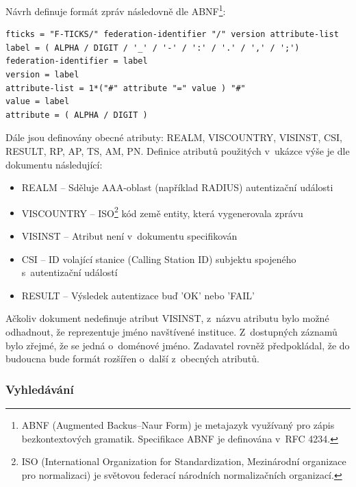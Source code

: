 \documentclass[thesis=M,czech]{FITthesis}[2012/06/26]
\begin{document}
    Návrh definuje formát zpráv následovně dle ABNF\footnote{
      ABNF (Augmented Backus--Naur Form) je metajazyk využívaný pro zápis bezkontextových gramatik.
      Specifikace ABNF je definována v~RFC 4234.
    }:
    \begin{verbatim}
fticks = "F-TICKS/" federation-identifier "/" version attribute-list
label = ( ALPHA / DIGIT / '_' / '-' / ':' / '.' / ',' / ';')
federation-identifier = label
version = label
attribute-list = 1*("#" attribute "=" value ) "#"
value = label
attribute = ( ALPHA / DIGIT )
    \end{verbatim}

    Dále jsou definovány obecné atributy: REALM, VISCOUNTRY, VISINST, CSI, RESULT, RP, AP, TS, AM, PN.
    Definice atributů použitých v~ukázce výše je dle dokumentu následující:
    \begin{itemize}
      \item{REALM -- Sděluje AAA-oblast (například RADIUS) autentizační události}
      \item{VISCOUNTRY -- ISO\footnote{
        ISO (International Organization for Standardization, Mezinárodní organizace pro normalizaci) je světovou
        federací národních normalizačních organizací.
      }
      kód země entity, která vygenerovala zprávu}
      \item{VISINST -- Atribut není v~dokumentu specifikován}
      \item{CSI -- ID
        volající stanice (Calling Station ID) subjektu spojeného s~autentizační událostí}
      \item{RESULT -- Výsledek autentizace buď 'OK' nebo 'FAIL'}
    \end{itemize}

    Ačkoliv dokument nedefinuje atribut VISINST, z~názvu atributu bylo možné odhadnout, 
    že reprezentuje jméno navštívené instituce. 
    Z~dostupných záznamů bylo zřejmé, že se jedná o~doménové jméno.
    Zadavatel rovněž předpokládal, že do budoucna bude formát rozšířen o~další z~obecných atributů.

  \subsubsection{Vyhledávání}
  \label{searching}
    
    
\end{document}
